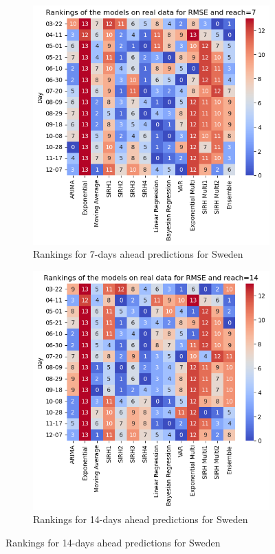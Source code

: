 \begin{figure}[h!]
  \centering
  \begin{subfigure}[b]{0.45\textwidth}
    \centering
    \includegraphics[width=\textwidth]{figures/heatmap_test_sweden_7.png}  
    \caption{Rankings for 7-days ahead predictions for Sweden }
    \label{fig:sousfig1}
  \end{subfigure}
  \hfill
  \begin{subfigure}[b]{0.45\textwidth}
    \centering
    \includegraphics[width=\textwidth]{figures/heatmap_test_sweden_14.png}  
    \caption{Rankings for 14-days ahead predictions for Sweden }
    \label{fig:sousfig2}
  \end{subfigure}
  

\end{figure}
